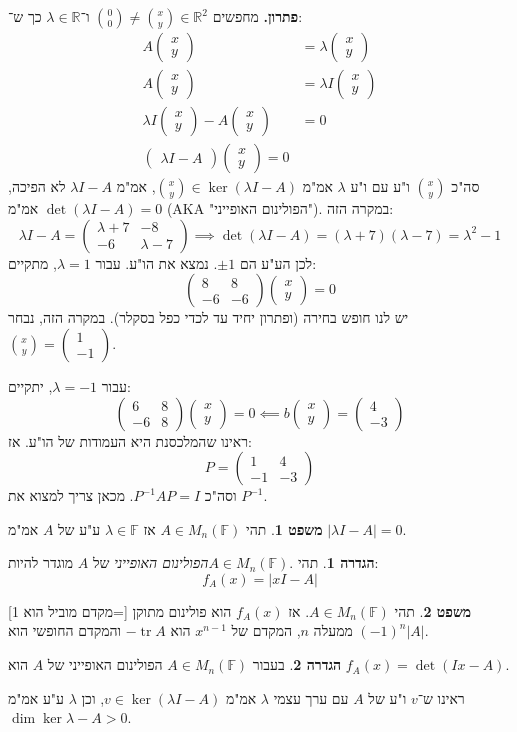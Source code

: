 \documentclass[a4paper]{article}
\newcommand\R     {\mathbb{R}}
\DeclareMathOperator{\tr}      {tr}
\newcommand\F         {\mathbb{F}}
\newcommand\pms[1]    {\begin{pmatrix}
		#1
\end{pmatrix}}
\renewcommand\lg      {\lambda}
\newcommand\op    {^{-1}}
\theoremstyle{definition}
\newtheorem{Theorem}{משפט}
\newtheorem{definition}{הגדרה}
\newcommand\theo  [1] {\begin{Theorem}#1\end{Theorem}}
\newcommand\defi  [1] {\begin{definition}#1\end{definition}}
\begin{document}
	\textbf{פתרון. }מחפשים $\binom{0}{0} \neq \binom{x}{y} \in \R^2$ ו־$\lg \in \R$ כך ש־: 
	\begin{align*}
		A\pms{x \\ y} &= \lg \pms{x \\ y} \\
		A\pms{x \\ y} &= \lg I \pms{x \\ y} \\
		\lg I \pms{x \\ y} - A \pms{x \\ y} &= 0 \\
		\pms{\lg I - A} \pms{x \\ y} = 0
	\end{align*}
	סה"כ $\binom{x}{y}$ ו"ע עם ו"ע $\lg$ אמ"מ $\binom{x}{y} \in \ker (\lg I - A)$, אמ"מ $\lg I - A$ לא הפיכה, אמ"מ $\det(\lg I - A) = 0$ (AKA "הפולינום האופייני"). במקרה הזה: 
	\[ \lg I - A = \pms{\lg + 7 & -8 \\ -6 & \lg - 7} \implies \det(\lg I - A) = (\lg + 7)(\lg - 7) = \lg^2 - 1 \]
	לכן הע"ע הם $\pm 1$. נמצא את הו"ע. עבור $\lg = 1$, מתקיים: 
	\[ \pms{8 & 8 \\ -6 & -6}\pms{x \\ y} = 0 \]
	יש לנו חופש בחירה (ופתרון יחיד עד לכדי כפל בסקלר). במקרה הזה, נבחר $\binom{x}{y} = \pms{1 \\ -1}$. 
	
	עבור $\lg = -1$, יתקיים: 
	\[ \pms{6 & 8 \\ -6 & 8}\pms{x \\ y} = 0 \impliedby b\pms{x \\ y} = \pms{4 \\ -3} \]
	ראינו שהמלכסנת היא העמודות של הו"ע. אז: 
	\[ P = \pms{1 & 4 \\ -1 & -3} \]
	וסה"כ $P\op A P = I$. מכאן צריך למצוא את $P\op$. 
	
	\theo{תהי $A \in M_n(\F)$ אז $\lg \in \F$ ע"ע של $A$ אמ"מ $|\lg I - A| = 0$. }
	
	\defi{תהי $A \in M_n(\F). $\textit{הפולינום האופייני} של $A$ מוגדר להיות: 
		\[ f_A(x) = |xI - A| \]}
	
	\theo{תהי $A \in M_n(\F)$. אז $f_A(x)$ הוא פולינום מתוקן [=מקדם מוביל הוא 1] ממעלה $n$, המקדם של $x^{n - 1}$ הוא $- \tr A$ והמקדם החופשי הוא $(-1)^{n}|A|$. }
	
	\defi{בעבור $A \in M_n(\F)$ הפולינום האופייני של $A$ הוא $f_A(x) = \det(Ix - A)$. }
	
	ראינו ש־$v$ ו"ע של $A$ עם ערך עצמי $\lg$ אמ"מ $v \in \ker(\lg I - A)$, וכן $\lg$ ע"ע אמ"מ $\dim \ker \lg - A > 0$. 
	
\end{document}
